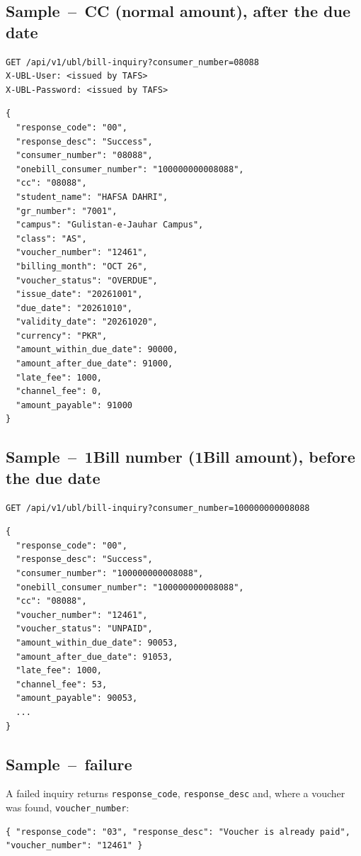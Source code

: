 \documentclass[11pt]{article}
\begin{document}
\subsection{Sample \,--\, CC (normal amount), after the due date}
\begin{lstlisting}
GET /api/v1/ubl/bill-inquiry?consumer_number=08088
X-UBL-User: <issued by TAFS>
X-UBL-Password: <issued by TAFS>
\end{lstlisting}
\begin{lstlisting}
{
  "response_code": "00",
  "response_desc": "Success",
  "consumer_number": "08088",
  "onebill_consumer_number": "100000000008088",
  "cc": "08088",
  "student_name": "HAFSA DAHRI",
  "gr_number": "7001",
  "campus": "Gulistan-e-Jauhar Campus",
  "class": "AS",
  "voucher_number": "12461",
  "billing_month": "OCT 26",
  "voucher_status": "OVERDUE",
  "issue_date": "20261001",
  "due_date": "20261010",
  "validity_date": "20261020",
  "currency": "PKR",
  "amount_within_due_date": 90000,
  "amount_after_due_date": 91000,
  "late_fee": 1000,
  "channel_fee": 0,
  "amount_payable": 91000
}
\end{lstlisting}

\subsection{Sample \,--\, 1Bill number (1Bill amount), before the due date}
\begin{lstlisting}
GET /api/v1/ubl/bill-inquiry?consumer_number=100000000008088
\end{lstlisting}
\begin{lstlisting}
{
  "response_code": "00",
  "response_desc": "Success",
  "consumer_number": "100000000008088",
  "onebill_consumer_number": "100000000008088",
  "cc": "08088",
  "voucher_number": "12461",
  "voucher_status": "UNPAID",
  "amount_within_due_date": 90053,
  "amount_after_due_date": 91053,
  "late_fee": 1000,
  "channel_fee": 53,
  "amount_payable": 90053,
  ...
}
\end{lstlisting}

\subsection{Sample \,--\, failure}
A failed inquiry returns \texttt{response\_code}, \texttt{response\_desc} and, where a voucher was found,
\texttt{voucher\_number}:
\begin{lstlisting}
{ "response_code": "03", "response_desc": "Voucher is already paid", "voucher_number": "12461" }
\end{lstlisting}
\end{document}
